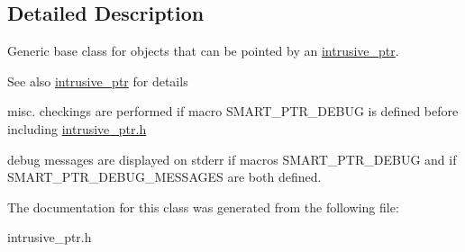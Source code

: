 \subsection{Detailed Description}
Generic base class for objects that can be pointed by an \hyperlink{classintrusive__ptr}{intrusive\+\_\+ptr}.
\begin{DoxyItemize}
\item \begin{DoxySeeAlso}{See also}
\hyperlink{classintrusive__ptr}{intrusive\+\_\+ptr} for details
\end{DoxySeeAlso}

\item misc. checkings are performed if macro S\+M\+A\+R\+T\+\_\+\+P\+T\+R\+\_\+\+D\+E\+B\+U\+G is defined before including \hyperlink{intrusive__ptr_8h_source}{intrusive\+\_\+ptr.\+h}
\item debug messages are displayed on stderr if macros S\+M\+A\+R\+T\+\_\+\+P\+T\+R\+\_\+\+D\+E\+B\+U\+G and if S\+M\+A\+R\+T\+\_\+\+P\+T\+R\+\_\+\+D\+E\+B\+U\+G\+\_\+\+M\+E\+S\+S\+A\+G\+E\+S are both defined. 
\end{DoxyItemize}

The documentation for this class was generated from the following file\+:\begin{DoxyCompactItemize}
\item 
intrusive\+\_\+ptr.\+h\end{DoxyCompactItemize}
